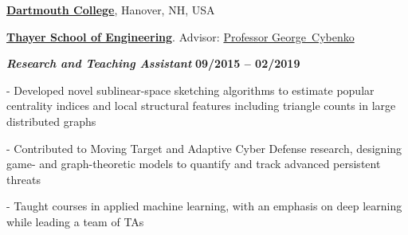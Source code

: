 \halfblankline




\href{https://dartmouth.edu}{\textbf{Dartmouth College}},
Hanover, NH, USA

\href{https://engineering.dartmouth.edu/}{\textbf{Thayer School of Engineering}}.
Advisor:               
\href{http://www.dartmouth.edu/~gvc/}
{Professor George~Cybenko}

\vspace{-0.5em}

\begin{outerlist}

\item[] \textbf{\textit{Research and Teaching Assistant}}%
\hfill \textbf{09/2015 -- 02/2019}

\begin{innerlist}

\item[-] Developed novel sublinear-space sketching algorithms to estimate popular centrality indices and local structural features including triangle counts in large distributed graphs 

\item[-] Contributed to Moving Target and Adaptive Cyber Defense research, designing game- and graph-theoretic models to quantify and track advanced persistent threats

\item[-] Taught courses in applied machine learning, with an emphasis on deep learning while leading a team of TAs

\end{innerlist}
\end{outerlist}


